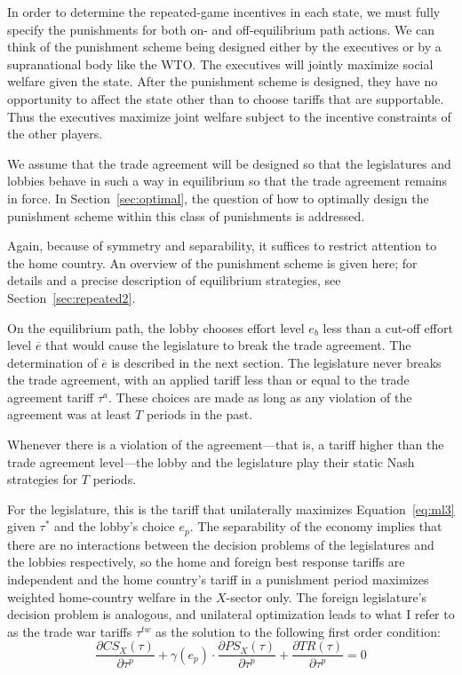 \documentclass[authoryear, review]{elsarticle}
\newcommand{\ov}{\overline}
\newcommand{\ga}{\gamma}
\begin{document}
In order to determine the repeated-game incentives in each state, we must fully specify the punishments for both on- and off-equilibrium path actions. We can think of the punishment scheme being designed either by the executives or by a supranational body like the WTO. The executives will jointly maximize social welfare given the state. After the punishment scheme is designed, they have no opportunity to affect the state other than to choose tariffs that are supportable. Thus the executives maximize joint welfare subject to the incentive constraints of the other players.

We assume that the trade agreement will be designed so that the legislatures and lobbies behave in such a way in equilibrium so that the trade agreement remains in force. In Section~\ref{sec:optimal}, the question of how to optimally design the punishment scheme within this class of punishments is addressed.

Again, because of symmetry and separability, it suffices to restrict attention to the home country. An overview of the punishment scheme is given here; for details and a precise description of equilibrium strategies, see Section~\ref{sec:repeated2}.

On the equilibrium path, the lobby chooses effort level $e_b$ less than a cut-off effort level $\ov{e}$ that would cause the legislature to break the trade agreement. The determination of $\ov{e}$ is described in the next section. The legislature never breaks the trade agreement, with an applied tariff less than or equal to the trade agreement tariff $\tau^a$. These choices are made as long as any violation of the agreement was at least $T$ periods in the past.

Whenever there is a violation of the agreement---that is, a tariff higher than the trade agreement level---the lobby and the legislature play their static Nash strategies for $T$ periods.

For the legislature, this is the tariff that unilaterally maximizes Equation~\ref{eq:ml3} given $\tau^*$ and the lobby's choice $e_{p}$. The separability of the economy implies that there are no interactions between the decision problems of the legislatures and the lobbies respectively, so the home and foreign best response tariffs are independent and the home country's tariff in a punishment period maximizes weighted home-country welfare in the $X$-sector only. The foreign legislature's decision problem is analogous, and unilateral optimization leads to what I refer to as the trade war tariffs $\tau^{tw}$ as the solution to the following first order condition:
\[
		\frac{\partial \mathit{CS}_X(\tau)}{\partial \tau^{p}} + \ga(e_{p}) \cdot \frac{\partial \mathit{PS}_X(\tau)}{\partial \tau^{p}} +  \frac{\partial \mathit{TR}(\tau)}{\partial \tau^{p}} = 0
		\label{eq:leguni}
\]
\end{document}
